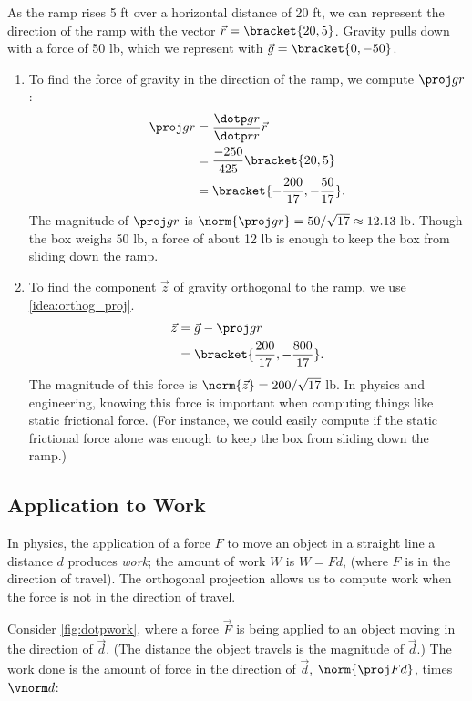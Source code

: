 {As the ramp rises 5 ft over a horizontal distance of 20 ft, we can represent the direction of the ramp with the vector $\vec r=\bracket{20,5}$. Gravity pulls down with a force of 50 lb, which we represent with $\vec g =\bracket{0,-50}$. 
\begin{enumerate}
	\item To find the force of gravity in the direction of the ramp, we compute $\proj gr$:
	\begin{align*}
	\proj gr &= \frac{\dotp gr}{\dotp rr}\vec r\\
	&=  \frac{-250}{425}\bracket{20,5}\\
	&=\bracket{-\frac{200}{17},-\frac{50}{17}}%
	.
	\end{align*}
	The magnitude of $\proj gr$ is $\norm{\proj gr} = 50/\sqrt{17} \approx 12.13\text{ lb}$. Though the box weighs 50 lb, a force of about 12 lb is enough to keep the box from sliding down the ramp.
	
	\item		To find the component $\vec z$ of gravity orthogonal to the ramp, we use \autoref{idea:orthog_proj}.
	\begin{align*}
	\vec z &= \vec g - \proj gr \\
	&=\bracket{\frac{200}{17},-\frac{800}{17}}%
	.
	\end{align*}
	The magnitude of this force is $\norm{\vec z}=200/\sqrt{17}%
	$ lb. In physics and engineering, knowing this force is important when computing things like static frictional force. (For instance, we could easily compute if the static frictional force alone was enough to keep the box from sliding down the ramp.)\eoehere
\end{enumerate}}

\subsection{Application to Work}

In physics, the application of a force $F$ to move an object in a straight line a distance $d$ produces \emph{work}; the amount of work $W$ is $W=Fd$, (where $F$ is in the direction of travel). The orthogonal projection allows us to compute work when the force is not in the direction of travel.

Consider \autoref{fig:dotpwork}, where a force $\vec F$ is being applied to an object moving in the direction of $\vec d$. (The distance the object travels is the magnitude of $\vec d$.) The work done is the amount of force in the direction of $\vec d$, $\norm{\proj Fd}$, times $\vnorm d$:

